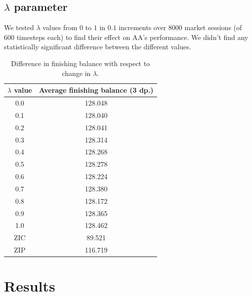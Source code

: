 \documentclass[preprint]{acm_proc_article-sp} %
\begin{document}
\subsection{$\lambda$ parameter} \label{sec:calibration_lambda}
We tested $\lambda$ values from $0$ to $1$ in $0.1$ increments over 8000
market sessions (of 600 timesteps each) to find their effect on AA's
performance. We didn't find any statistically significant difference between
the different values. 

\begin{table}[H]
  \centering
  \begin{tabular}{ | c | c | }
    \hline
    \textbf{$\lambda$ value} & \textbf{Average finishing balance (3 dp.)} \\
    \hline
        0.0 & 128.048 \\
        0.1 & 128.040 \\
        0.2 & 128.041 \\
        0.3 & 128.314 \\
        0.4 & 128.268 \\
        0.5 & 128.278 \\
        0.6 & 128.224 \\
        0.7 & 128.380 \\
        0.8 & 128.172 \\
        0.9 & 128.365 \\
        1.0 & 128.462 \\
    \hline \hline
        ZIC &  89.521 \\
        ZIP & 116.719 \\
    \hline
  \end{tabular}
  \caption{Difference in finishing balance with respect to change in $\lambda$.}
  \label{tbl:lambda_results}
\end{table}


\section{Results} \label{sec:results}
\end{document}
